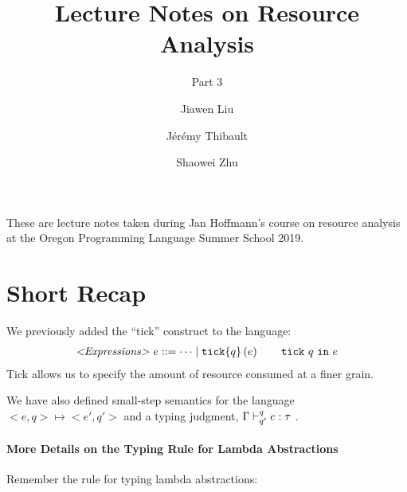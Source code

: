 \documentclass[ manuscript,screen, nonacm]{acmart}
\begin{document}
\author{Jiawen Liu}

\author{J\'er\'emy Thibault}

\author{Shaowei Zhu}

\title{Lecture Notes on Resource Analysis}
\subtitle{Part 3}

\maketitle

These are lecture notes taken during Jan Hoffmann's course on resource analysis at the Oregon
Programming Language Summer School 2019.

\section{Short Recap}
We previously added the ``tick'' construct to the language:
\begin{align*}
    \textrm{\emph{<Expressions>}}~e ::= \dots \mid \tickc{q}{e} \quad\quad \tick{q}{e}
\end{align*}
Tick allows us to specify the amount of resource consumed at a finer grain.

We have also defined small-step semantics for the language
\( <e,q> \mapsto <e', q'> \) and a typing judgment,
\( \typ{\Gamma}{q}{q'}{e}{\tau} \)
.








\paragraph{More Details on the Typing Rule for Lambda Abstractions}

Remember the rule for typing lambda abstractions:
\begin{mathpar}
\end{mathpar}
\end{document}
